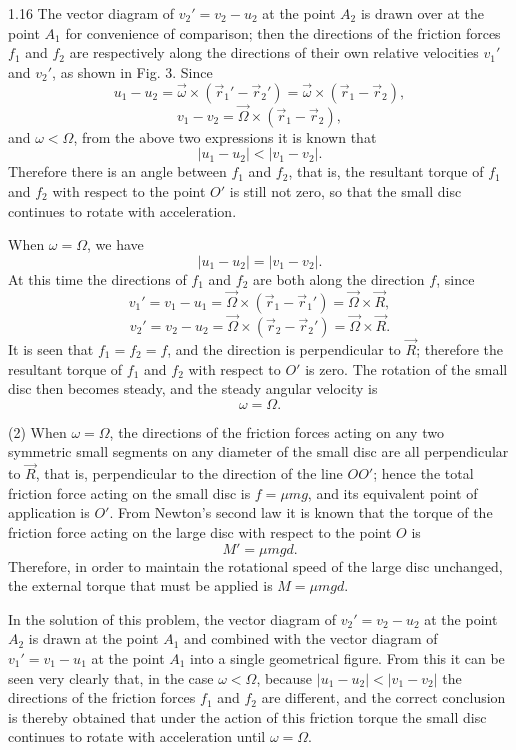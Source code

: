 \begin{solution}{1.16}
The vector diagram of $v_2'=v_2-u_2$ at the point $A_2$ is drawn over at the point $A_1$ for convenience of comparison; then the directions of the friction forces $f_1$ and $f_2$ are respectively along the directions of their own relative velocities $v_1'$ and $v_2'$, as shown in Fig. 3. Since
\[
u_1-u_2=\vec{\omega}\times(\vec{r}_1'-\vec{r}_2')=\vec{\omega}\times(\vec{r}_1-\vec{r}_2),
\]
\[
v_1-v_2=\vec{\Omega}\times(\vec{r}_1-\vec{r}_2),
\]
and $\omega<\Omega$, from the above two expressions it is known that
\[
|u_1-u_2|<|v_1-v_2|.
\]
Therefore there is an angle between $f_1$ and $f_2$, that is, the resultant torque of $f_1$ and $f_2$ with respect to the point $O'$ is still not zero, so that the small disc continues to rotate with acceleration.

When $\omega=\Omega$, we have
\[
|u_1-u_2|=|v_1-v_2|.
\]
At this time the directions of $f_1$ and $f_2$ are both along the direction $f$, since
\[
v_1'=v_1-u_1=\vec{\Omega}\times(\vec{r}_1-\vec{r}_1')=\vec{\Omega}\times\vec{R},
\]
\[
v_2'=v_2-u_2=\vec{\Omega}\times(\vec{r}_2-\vec{r}_2')=\vec{\Omega}\times\vec{R}.
\]
It is seen that $f_1=f_2=f$, and the direction is perpendicular to $\vec{R}$; therefore the resultant torque of $f_1$ and $f_2$ with respect to $O'$ is zero. The rotation of the small disc then becomes steady, and the steady angular velocity is
\[
\omega=\Omega.
\]

(2) When $\omega=\Omega$, the directions of the friction forces acting on any two symmetric small segments on any diameter of the small disc are all perpendicular to $\vec{R}$, that is, perpendicular to the direction of the line $OO'$; hence the total friction force acting on the small disc is $f=\mu mg$, and its equivalent point of application is $O'$. From Newton's second law it is known that the torque of the friction force acting on the large disc with respect to the point $O$ is
\[
M'=\mu mgd.
\]
Therefore, in order to maintain the rotational speed of the large disc unchanged, the external torque that must be applied is $M=\mu mgd$.

\begin{commentary}
In the solution of this problem, the vector diagram of $v_2'=v_2-u_2$ at the point $A_2$ is drawn at the point $A_1$ and combined with the vector diagram of $v_1'=v_1-u_1$ at the point $A_1$ into a single geometrical figure. From this it can be seen very clearly that, in the case $\omega<\Omega$, because $|u_1-u_2|<|v_1-v_2|$ the directions of the friction forces $f_1$ and $f_2$ are different, and the correct conclusion is thereby obtained that under the action of this friction torque the small disc continues to rotate with acceleration until $\omega=\Omega$.
\end{commentary}
\end{solution}

